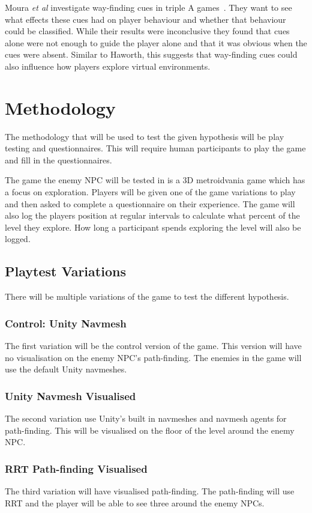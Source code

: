 \documentclass[journal]{IEEEtran}
\begin{document}
Moura \textit{et al} investigate way-finding cues in triple A games~\cite{moura2014}. They want to see what effects these cues had on player behaviour and whether that behaviour could be classified. While their results were inconclusive they found that cues alone were not enough to guide the player alone and that it was obvious when the cues were absent. Similar to Haworth, this suggests that way-finding cues could also influence how players explore virtual environments.

\section{Methodology}
The methodology that will be used to test the given hypothesis will be play testing and questionnaires. This will require human participants to play the game and fill in the questionnaires. 

The game the enemy NPC will be tested in is a 3D metroidvania game which has a focus on exploration. Players will be given one of the game variations to play and then asked to complete a questionnaire on their experience. The game will also log the players position at regular intervals to calculate what percent of the level they explore. How long a participant spends exploring the level will also be logged.  

\subsection{Playtest Variations}
There will be multiple variations of the game to test the different hypothesis. 

\subsubsection{Control: Unity Navmesh}
The first variation will be the control version of the game. This version will have no visualisation on the enemy NPC's path-finding. The enemies in the game will use the default Unity navmeshes.

\subsubsection{Unity Navmesh Visualised}
The second variation use Unity's built in navmeshes and navmesh agents for path-finding. This will be visualised on the floor of the level around the enemy NPC.

\subsubsection{RRT Path-finding Visualised}
The third variation will have visualised path-finding. The path-finding will use RRT and the player will be able to see three around the enemy NPCs.
\end{document}
